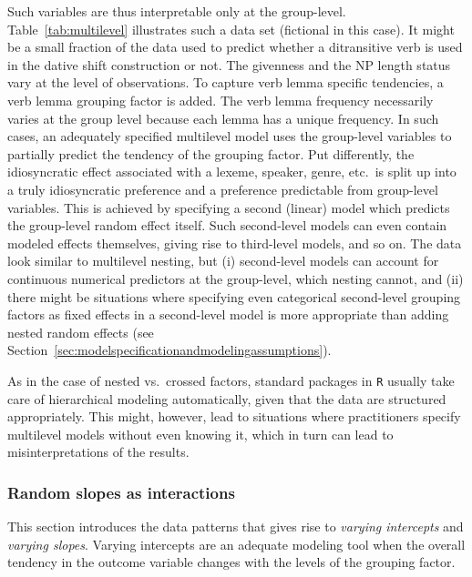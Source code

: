 Such variables are thus interpretable only at the group-level.
Table~\ref{tab:multilevel} illustrates such a data set (fictional in this case).
It might be a small fraction of the data used to predict whether a ditransitive verb is used in the dative shift construction or not.
The givenness and the NP length status vary at the level of observations.
To capture verb lemma specific tendencies, a verb lemma grouping factor is added.
The verb lemma frequency necessarily varies at the group level because each lemma has a unique frequency.
In such cases, an adequately specified multilevel model uses the group-level variables to partially predict the tendency of the grouping factor.
Put differently, the idiosyncratic effect associated with a lexeme, speaker, genre, etc.\ is split up into a truly idiosyncratic preference and a preference predictable from group-level variables.
This is achieved by specifying a second (linear) model which predicts the group-level random effect itself.
Such second-level models can even contain modeled effects themselves, giving rise to third-level models, and so on.
The data look similar to multilevel nesting, but (i) second-level models can account for continuous numerical predictors at the group-level, which nesting cannot, and (ii) there might be situations where specifying even categorical second-level grouping factors as fixed effects in a second-level model is more appropriate than adding nested random effects (see Section~\ref{sec:modelspecificationandmodelingassumptions}).

As in the case of nested vs.\ crossed factors, standard packages in \texttt{R} usually take care of hierarchical modeling automatically, given that the data are structured appropriately.
This might, however, lead to situations where practitioners specify multilevel models without even knowing it, which in turn can lead to misinterpretations of the results.

\subsubsection{Random slopes as interactions}
\label{sec:randominterceptsandslopes}

This section introduces the data patterns that gives rise to \textit{varying intercepts} and \textit{varying slopes}. 
Varying intercepts are an adequate modeling tool when the overall tendency in the outcome variable changes with the levels of the grouping factor.

